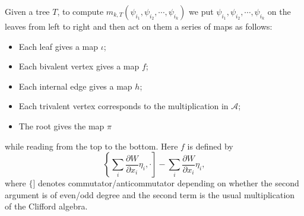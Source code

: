 \documentclass[a4paper,11pt]{article}
\def\cA{\mathcal{A}}
\numberwithin{equation}{section}
\begin{document}
Given a tree $T$, to compute $m_{k,T}(\psi_{i_1},\psi_{i_2},\cdots,\psi_{i_k})$ 
we put $\psi_{i_1},\psi_{i_2},\cdots,\psi_{i_k}$ on the leaves from left to 
right and then act on them a series of maps as follows:
\begin{itemize}
\item Each leaf gives a map $\iota$;
\item Each bivalent vertex gives a map $f$;
\item Each internal edge gives a map $h$;
\item Each trivalent vertex corresponds to the multiplication in $\cA$;
\item The root gives the map $\pi$
\end{itemize} 
while reading from the top to the bottom. Here $f$ is defined by
\[
\left\{ \sum_i \frac{\partial W}{\partial x_i} \eta_i, \cdot \right] - \sum_i 
\frac{\partial W}{\partial x_i} \eta_i ,
\]
where $\{ ]$ denotes commutator/anticommutator depending on whether the second argument is of even/odd degree and the second term is the usual multiplication of the Clifford algebra.
\end{document}
